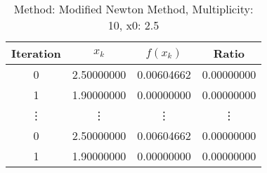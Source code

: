 \begin{table}
\centering
\caption{Method: Modified Newton Method, Multiplicity: 10, x0: 2.5}
\label{tab:table_Modified_Newton_Method_10_2_5}
\begin{tabular}{c c c c}
\toprule
Iteration &      $x_k$ &   $f(x_k)$ &      Ratio \\
\midrule
        0 & 2.50000000 & 0.00604662 & 0.00000000 \\
        1 & 1.90000000 & 0.00000000 & 0.00000000 \\
   \vdots &     \vdots &     \vdots &     \vdots \\
        0 & 2.50000000 & 0.00604662 & 0.00000000 \\
        1 & 1.90000000 & 0.00000000 & 0.00000000 \\
\bottomrule
\end{tabular}
\end{table}

